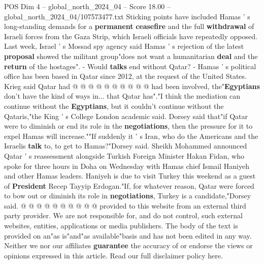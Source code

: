 \begin{textsample}{POS Dim 4 – global\_north\_2024\_04 – Score 18.00 – global\_north\_2024\_04/107573477.txt}
Sticking points have included Hamas ' s long-standing demands for a \textbf{permanent} \textbf{ceasefire} and the full \textbf{withdrawal} of Israeli forces from the Gaza Strip, which Israeli officials have repeatedly opposed.
Last week, Israel ' s Mossad spy agency said Hamas ' s rejection of the latest \textbf{proposal} showed the militant group"does not want a humanitarian \textbf{deal} and the \textbf{return} of the hostages". - Would \textbf{talks} end without Qatar? - Hamas ' s political office has been based in Qatar since 2012, at the request of the United States.
Krieg said Qatar had @ @ @ @ @ @ @ @ @ @ had been involved, the"\textbf{Egyptians} don't have the kind of ways in... that Qatar has"."I think the mediation can continue without the \textbf{Egyptians}, but it couldn't continue without the Qataris,"the King ' s College London academic said.
Dorsey said that"if Qatar were to diminish or end its role in the \textbf{negotiations}, then the pressure for it to expel Hamas will increase.""If suddenly it ' s Iran, who do the Americans and the Israelis \textbf{talk} to, to get to Hamas?"Dorsey said.
Sheikh Mohammed announced Qatar ' s reassessment alongside Turkish Foreign Minister Hakan Fidan, who spoke for three hours in Doha on Wednesday with Hamas chief Ismail Haniyeh and other Hamas leaders.
Haniyeh is due to visit Turkey this weekend as a guest of \textbf{President} Recep Tayyip Erdogan."If, for whatever reason, Qatar were forced to bow out or diminish its role in \textbf{negotiations}, Turkey is a candidate,"Dorsey said. @ @ @ @ @ @ @ @ @ @ provided to this website from an external third party provider.
We are not responsible for, and do not control, such external websites, entities, applications or media publishers.
The body of the text is provided on an"as is"and"as available"basis and has not been edited in any way.
Neither we nor our affiliates \textbf{guarantee} the accuracy of or endorse the views or opinions expressed in this article.
Read our full disclaimer policy here.

\end{textsample}
